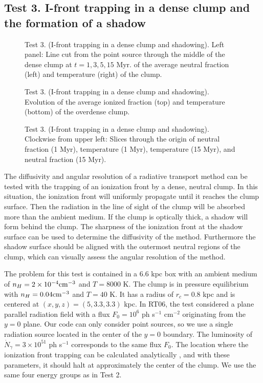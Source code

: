 \documentclass[apj,onecolumn]{emulateapj}
\begin{document}
\subsection{Test 3. I-front trapping in a dense clump and the
  formation of a shadow}
\label{sec:test3}

\begin{figure}[t]
  \caption{\label{fig:test3_1} Test 3. (I-front trapping in a dense
    clump and shadowing).  Left panel: Line cut from the point source
    through the middle of the dense clump at $t = 1, 3, 5, 15$ Myr.
    of the average neutral fraction (left) and temperature
    (right) of the clump.}
\end{figure}

\begin{figure}[t]
  \caption{\label{fig:test3_2} Test 3. (I-front trapping in a dense
    clump and shadowing).  Evolution of the average ionized fraction
    (top) and temperature (bottom) of the overdense clump.}
\end{figure}

\begin{figure}[t]
  \caption{\label{fig:test3_3} Test 3. (I-front trapping in a dense
    clump and shadowing).  Clockwise from upper left: Slices through
    the origin of neutral fraction (1 Myr), temperature (1 Myr),
    temperature (15 Myr), and neutral fraction (15 Myr).}
\end{figure}

The diffusivity and angular resolution of a radiative transport method
can be tested with the trapping of an ionization front by a dense,
neutral clump.  In this situation, the ionization front will uniformly
propagate until it reaches the clump surface.  Then the radiation in
the line of sight of the clump will be absorbed more than the ambient
medium.  If the clump is optically thick, a shadow will form behind
the clump.  The sharpness of the ionization front at the shadow
surface can be used to determine the diffusivity of the method.
Furthermore the shadow surface should be aligned with the outermost
neutral regions of the clump, which can visually assess the angular
resolution of the method.

The problem for this test is contained in a 6.6 kpc box with an
ambient medium of $n_H = 2 \times 10^{-4} \cubecm$ and $T = 8000$ K.
The clump is in pressure equilibrium with $n_H = 0.04 \cubecm$ and $T
= 40$ K.  It has a radius of $r_c = 0.8$ kpc and is centered at
$(x,y,z) = (5, 3.3, 3.3)$ kpc.  In RT06, the test considered a plane
parallel radiation field with a flux $F_0 = 10^6$ ph s$^{-1}$
cm$^{-2}$ originating from the $y=0$ plane.  Our code can only
consider point sources, so we use a single radiation source located in
the center of the $y=0$ boundary.  The luminosity of $\dot{N}_\gamma =
3 \times 10^{51}$ ph s$^{-1}$ corresponds to the same flux $F_0$.  The
location where the ionization front trapping can be calculated
analytically \citep{Shapiro04}, and with these parameters, it should
halt at approximately the center of the clump.  We use the same four
energy groups as in Test 2.
\end{document}
